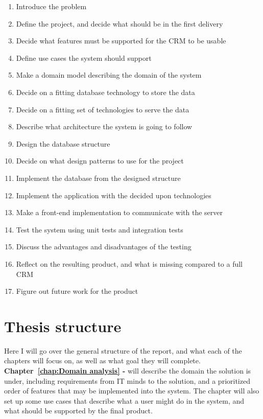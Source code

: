 \begin{enumerate}
  \item Introduce the problem
  \item Define the project, and decide what should be in the first delivery
  \item Decide what features must be supported for the CRM to be usable
  \item Define use cases the system should support
  \item Make a domain model describing the domain of the system
  \item Decide on a fitting database technology to store the data
  \item Decide on a fitting set of technologies to serve the data
  \item Describe what architecture the system is going to follow
  \item Design the database structure
  \item Decide on what design patterns to use for the project
  \item Implement the database from the designed structure
  \item Implement the application with the decided upon technologies
  \item Make a front-end implementation to communicate with the server
  \item Test the system using unit tests and integration tests
  \item Discuss the advantages and disadvantages of the testing
  \item Reflect on the resulting product, and what is missing compared to a full CRM
  \item Figure out future work for the product
\end{enumerate}

\section{Thesis structure}
\label{sec:Thesis structure}
Here I will go over the general structure of the report, and what each of the
chapters will focus on, as well as what goal they will complete.\\ 

\textbf{Chapter~\ref{chap:Domain analysis} - }
will describe the domain the solution is under, including requirements from IT
minds to the solution, and a prioritized order of features that may be
implemented into the system. The chapter will also set up some use cases that
describe what a user might do in the system, and what should be supported by the
final product. 

